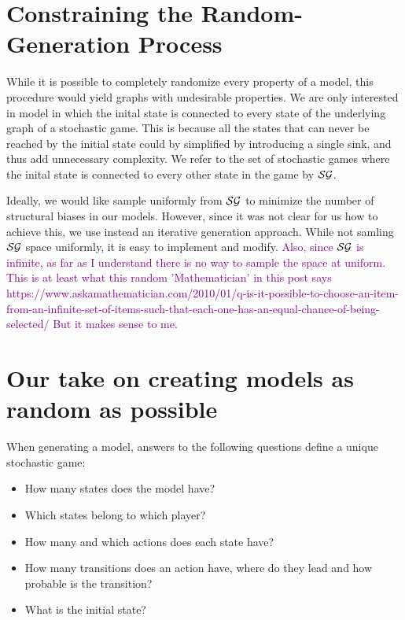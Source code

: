 
\section{Constraining the Random-Generation Process}
While it is possible to completely randomize every property of a model, this procedure would yield graphs with undesirable properties. 
We are only interested in model in which the inital state is connected to every state of the underlying graph of a stochastic game. 
This is because all the states that can never be reached by the initial state could by simplified by introducing a single sink, and thus add unnecessary complexity.
We refer to the set of stochastic games where the inital state is connected to every other state in the game by $\mathcal{SG}$.

Ideally, we would like sample uniformly from $\mathcal{SG}$ to minimize the number of structural biases in our models. 
However, since it was not clear for us how to achieve this, 
we use instead an iterative generation approach. While not samling $\mathcal{SG}$ space uniformly, it is easy to implement and modify.
\textcolor{purple}{Also, since $\mathcal{SG}$ is infinite, as far as I understand there is no way to sample the space at uniform.
This is at least what this random 'Mathematician' in this post says https://www.askamathematician.com/2010/01/q-is-it-possible-to-choose-an-item-from-an-infinite-set-of-items-such-that-each-one-has-an-equal-chance-of-being-selected/ 
But it makes sense to me.}

\section{Our take on creating models as random as possible} \label{sec:randomGenAlgo}
When generating a model, answers to the following questions define a unique stochastic game:
\begin{itemize}
    \item How many states does the model have?
    \item Which states belong to which player?
    \item How many and which actions does each state have?
    \item How many transitions does an action have, where do they lead and how probable is the transition?
    \item What is the initial state?
\end{itemize}

